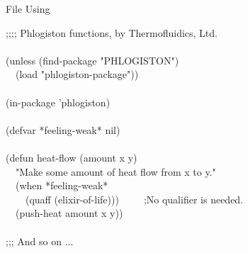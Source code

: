 \begin{table}[b]
\caption{File \protect{} Using \protect{}}
\label{DEFPACKAGE-PHLOGISTON-FILE-TABLE}
\begin{lisp}
;;;; Phlogiston functions, by Thermofluidics, Ltd. \\
 \\
(unless (find-package "PHLOGISTON") \\
~~(load "phlogiston-package")) \\
 \\
(in-package 'phlogiston) \\
\\
(defvar *feeling-weak* nil) \\
\\
(defun heat-flow (amount x y) \\
~~"Make some amount of heat flow from x to y." \\
~~(when *feeling-weak* \\
~~~~(quaff (elixir-of-life)))~~~~~;No qualifier is needed. \\
~~(push-heat amount x y)) \\
 \\
;;; And so on ...
\end{lisp}
\end{table}
